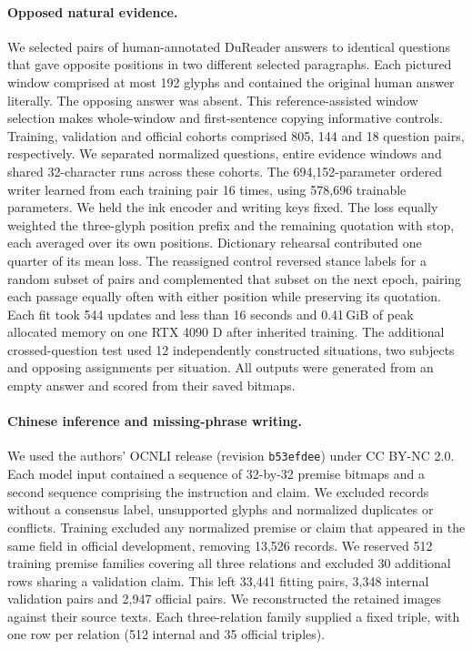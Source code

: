 \documentclass[12pt,a4paper]{article}
\providecommand{\DIFadd}[1]{{\protect\color{blue} \sf #1}} %
\begin{document}
\paragraph{\DIFadd{Opposed natural evidence.}} \DIFadd{We selected pairs of human-annotated DuReader answers to identical questions that gave opposite positions in two different selected paragraphs. Each pictured window comprised at most 192 glyphs and contained the original human answer literally. The opposing answer was absent. This reference-assisted window selection makes whole-window and first-sentence copying informative controls. Training, validation and official cohorts comprised 805, 144 and 18 question pairs, respectively. We separated normalized questions, entire evidence windows and shared 32-character runs across these cohorts. The 694,152-parameter ordered writer learned from each training pair 16 times, using 578,696 trainable parameters. We held the ink encoder and writing keys fixed. The loss equally weighted the three-glyph position prefix and the remaining quotation with stop, each averaged over its own positions. Dictionary rehearsal contributed one quarter of its mean loss. The reassigned control reversed stance labels for a random subset of pairs and complemented that subset on the next epoch, pairing each passage equally often with either position while preserving its quotation. Each fit took 544 updates and less than 16 seconds and 0.41\,GiB of peak allocated memory on one RTX 4090 D after inherited training. The additional crossed-question test used 12 independently constructed situations, two subjects and opposing assignments per situation. All outputs were generated from an empty answer and scored from their saved bitmaps.
}

\paragraph{\DIFadd{Chinese inference and missing-phrase writing.}}
\DIFadd{We used the authors' OCNLI release (revision \texttt{b53efdee}) under CC BY-NC 2.0\cite{ocnli}. Each model input contained a sequence of 32-by-32 premise bitmaps and a second sequence comprising the instruction and claim. We excluded records without a consensus label, unsupported glyphs and normalized duplicates or conflicts. Training excluded any normalized premise or claim that appeared in the same field in official development, removing 13,526 records. We reserved 512 training premise families covering all three relations and excluded 30 additional rows sharing a validation claim. This left 33,441 fitting pairs, 3,348 internal validation pairs and 2,947 official pairs. We reconstructed the retained images against their source texts. Each three-relation family supplied a fixed triple, with one row per relation (512 internal and 35 official triples).
}
\end{document}
